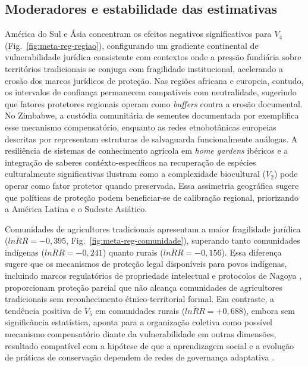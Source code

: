 \documentclass[12pt,a4paper]{article}
\begin{document}
\subsection{Moderadores e estabilidade das estimativas}
\label{sec:moderadores-discussao}

América do Sul e Ásia concentram os efeitos negativos significativos para $V_4$ (Fig.~\ref{fig:meta-reg-regiao}), configurando um gradiente continental de vulnerabilidade jurídica consistente com contextos onde a pressão fundiária sobre territórios tradicionais se conjuga com fragilidade institucional, acelerando a erosão dos marcos jurídicos de proteção. Nas regiões africana e europeia, contudo, os intervalos de confiança permanecem compatíveis com neutralidade, sugerindo que fatores protetores regionais operam como \textit{buffers} contra a erosão documental. No Zimbabwe, a custódia comunitária de sementes documentada por \citet{Sibanda2025} exemplifica esse mecanismo compensatório, enquanto as redes etnobotânicas europeias descritas por \citet{Gerner2025} representam estruturas de salvaguarda funcionalmente análogas. A resiliência de sistemas de conhecimento agrícola em \textit{home gardens} ibéricos \citep{ReyesGarcia2014} e a integração de saberes contéxto-específicos na recuperação de espécies culturalmente significativas \citep{Rayne2022} ilustram como a complexidade biocultural ($V_2$) pode operar como fator protetor quando preservada. Essa assimetria geográfica sugere que políticas de proteção podem beneficiar-se de calibração regional, priorizando a América Latina e o Sudeste Asiático.

Comunidades de agricultores tradicionais apresentam a maior fragilidade jurídica ($\overline{lnRR} = -0{,}395$, Fig.~\ref{fig:meta-reg-comunidade}), superando tanto comunidades indígenas ($\overline{lnRR} = -0{,}241$) quanto rurais ($\overline{lnRR} = -0{,}156$). Essa diferença sugere que os mecanismos de proteção legal disponíveis para povos indígenas, incluindo marcos regulatórios de propriedade intelectual e protocolos de Nagoya \citep{BavikatteRobinson2011,Robinson2014}, proporcionam proteção parcial que não alcança comunidades de agricultores tradicionais sem reconhecimento étnico-territorial formal. Em contraste, a tendência positiva de $V_5$ em comunidades rurais ($\overline{lnRR} = +0{,}688$), embora sem significância estatística, aponta para a organização coletiva como possível mecanismo compensatório diante da vulnerabilidade em outras dimensões, resultado compatível com a hipótese de que a aprendizagem social e a evolução de práticas de conservação dependem de redes de governança adaptativa \citep{BerkesTurner2006,Folke2004}.
\end{document}
